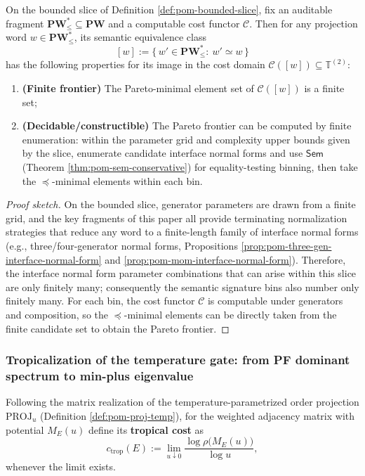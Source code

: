 \begin{proposition}\label{prop:pom-cost-optimization-decidable}
On the bounded slice of Definition \ref{def:pom-bounded-slice}, fix an auditable fragment \(\mathbf{PW}^{\ast}_{\le}\subseteq\mathbf{PW}\) and a computable cost functor \(\mathcal{C}\).
Then for any projection word \(w\in\mathbf{PW}^{\ast}_{\le}\), its semantic equivalence class
\[
[w]:=\{\,w'\in\mathbf{PW}^{\ast}_{\le}:\ w'\simeq w\,\}
\]
has the following properties for its image in the cost domain
\(
\mathcal{C}([w])\subseteq \mathbb{T}^{(2)}
\):
\begin{enumerate}
  \item \textbf{(Finite frontier)} The Pareto-minimal element set of \(\mathcal{C}([w])\) is a finite set;
  \item \textbf{(Decidable/constructible)} The Pareto frontier can be computed by finite enumeration: within the parameter grid and complexity upper bounds given by the slice, enumerate candidate interface normal forms and use \(\mathsf{Sem}\) (Theorem \ref{thm:pom-sem-conservative}) for equality-testing binning, then take the \(\preceq\)-minimal elements within each bin.
\end{enumerate}
\end{proposition}
\begin{proof}[Proof sketch]
On the bounded slice, generator parameters are drawn from a finite grid, and the key fragments of this paper all provide terminating normalization strategies that reduce any word to a finite-length family of interface normal forms (e.g., three/four-generator normal forms, Propositions \ref{prop:pom-three-gen-interface-normal-form} and \ref{prop:pom-mom-interface-normal-form}).
Therefore, the interface normal form parameter combinations that can arise within this slice are only finitely many; consequently the semantic signature bins also number only finitely many.
For each bin, the cost functor \(\mathcal{C}\) is computable under generators and composition, so the \(\preceq\)-minimal elements can be directly taken from the finite candidate set to obtain the Pareto frontier.
\end{proof}

\subsubsection{Tropicalization of the temperature gate: from PF dominant spectrum to min-plus eigenvalue}\label{subsec:pom-proj-tropicalization}
\begin{definition}\label{def:pom-proj-tropical-cost}
Following the matrix realization of the temperature-parametrized order projection \(\mathrm{PROJ}_u\) (Definition \ref{def:pom-proj-temp}), for the weighted adjacency matrix with potential \(M_E(u)\) define its \textbf{tropical cost} as
$$
c_{\mathrm{trop}}(E)
:=\lim_{u\downarrow 0}\frac{\log \rho\!\bigl(M_E(u)\bigr)}{\log u},
$$
whenever the limit exists.
\end{definition}

